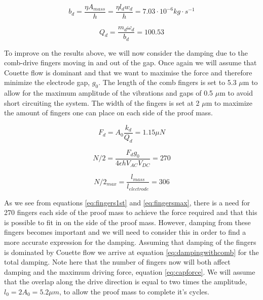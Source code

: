 \documentclass[12pt,a4paper,titlepage]{article}
\begin{document}
\begin{spacing}{1.1}
\begin{equation}
b_d = \dfrac{\eta A_{mass}}{h}= \dfrac{\eta l_d w_d}{h} = 7.03\cdot 10^{-6} kg \cdot s^{-1}
\label{eq:drivedamping}
\end{equation}

\begin{equation}
Q_d = \dfrac{m_d \omega_d}{b_d} = 100.53
\label{eq:Qfactordrivecalc1}
\end{equation}

To improve on the results above, we will now consider the damping due to the comb-drive fingers moving in and out of the gap. Once again we will assume that Couette flow is dominant and that we want to maximise the force and therefore minimize the electrode gap, $g_0$. The length of the comb fingers is set to 5.3 $\mu$m to allow for the maximum amplitude of the vibrations and gaps of 0.5 $\mu$m to avoid short circuiting the system. The width of the fingers is set at 2 $\mu$m to maximize the amount of fingers one can place on each side of the proof mass.

\begin{equation}
F_d = A_0 \dfrac{k_d}{Q_d} = 1.15 \mu N
\label{eq:driveforce1stapprox}
\end{equation}

\begin{equation}
N/2 = \dfrac{F_d g_0}{4 \epsilon h V_{AC} V_{DC} } = 270
\label{eq:fingers1st}
\end{equation}

\begin{equation}
N/2_{max}= \dfrac{l_{mass}}{l_{electrode}} = 306
\label{eq:fingersmax}
\end{equation}

As we see from equations \ref{eq:fingers1st} and \ref{eq:fingersmax}, there is a need for 270 fingers each side of the proof mass to achieve the force required and that this is possible to fit in on the side of the proof mass. However, damping from these fingers becomes important and we will need to consider this in order to find a more accurate expression for the damping. Assuming that damping of the fingers is dominated by Couette flow we arrive at equation \ref{eq:dampingwithcomb} for the total damping. Note here that the number of fingers now will both affect damping and the maximum driving force, equation \ref{eq:capforce}. We will assume that the overlap along the drive direction is equal to two times the amplitude, $l_0 = 2A_0 = 5.2 \mu m$, to allow the proof mass to complete it's cycles.


\end{spacing}
\end{document}
